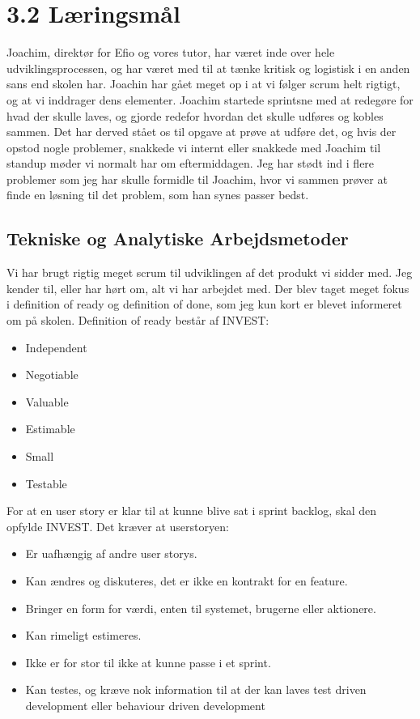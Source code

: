 \documentclass[11pt]{report}
\begin{document}
\section*{3.2 Læringsmål}
Joachim, direktør for Efio og vores tutor, har været inde over hele udviklingsprocessen, 
og har været med til at tænke kritisk og logistisk i en anden sans end skolen har. 
Joachin har gået meget op i at vi følger scrum helt rigtigt, og at vi inddrager dens elementer. 
Joachim startede sprintsne med at redegøre for hvad der skulle laves, og gjorde redefor hvordan 
det skulle udføres og kobles sammen. Det har derved stået os til opgave at prøve at udføre det, 
og hvis der opstod nogle problemer, snakkede vi internt eller snakkede med Joachim til standup møder vi 
normalt har om eftermiddagen. Jeg har stødt ind i flere problemer som jeg har skulle formidle til Joachim, 
hvor vi sammen prøver at finde en løsning til det problem, som han synes passer bedst. 

\subsection*{Tekniske og Analytiske Arbejdsmetoder}
Vi har brugt rigtig meget scrum til udviklingen af det produkt vi sidder med.
Jeg kender til, eller har hørt om, alt vi har arbejdet med. 
Der blev taget meget fokus i definition of ready og definition of done, som jeg kun kort er blevet informeret om 
på skolen.
Definition of ready består af INVEST:

\begin{itemize}
  \item Independent
  \item Negotiable
  \item Valuable
  \item Estimable
  \item Small
  \item Testable
\end{itemize}

For at en user story er klar til at kunne blive sat i sprint backlog, skal den opfylde INVEST. 
Det kræver at userstoryen:

\begin{itemize}
  \item Er uafhængig af andre user storys.
  \item Kan ændres og diskuteres, det er ikke en kontrakt for en feature.
  \item Bringer en form for værdi, enten til systemet, brugerne eller aktionere. 
  \item Kan rimeligt estimeres.
  \item Ikke er for stor til ikke at kunne passe i et sprint.
  \item Kan testes, og kræve nok information til at der kan laves test driven development eller behaviour driven development
\end{itemize}
\end{document}
